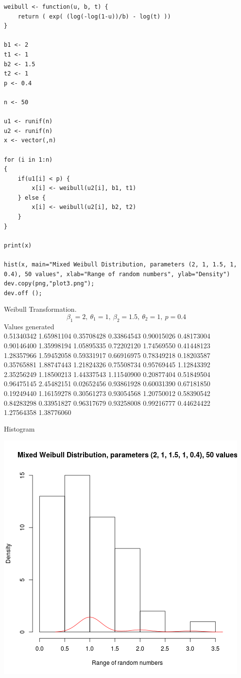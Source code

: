 \documentclass{article}
\begin{document}

\begin{lstlisting}
weibull <- function(u, b, t) {
	return ( exp( (log(-log(1-u))/b) - log(t) ))
}

b1 <- 2
t1 <- 1
b2 <- 1.5
t2 <- 1
p <- 0.4

n <- 50

u1 <- runif(n)
u2 <- runif(n)
x <- vector(,n)

for (i in 1:n)
{
	if(u1[i] < p) {
		x[i] <- weibull(u2[i], b1, t1)
	} else {
		x[i] <- weibull(u2[i], b2, t2)
	}
}

print(x)

hist(x, main="Mixed Weibull Distribution, parameters (2, 1, 1.5, 1, 0.4), 50 values", xlab="Range of random numbers", ylab="Density")
dev.copy(png,"plot3.png");
dev.off ();
\end{lstlisting}

Weibull Transformation.\\
$$\beta_1=2,\ \theta_1=1,\ \beta_2=1.5,\ \theta_2=1,\ p=0.4$$
Values generated\\
0.51340342 1.65981104 0.35708428 0.33864543 0.90015026 0.48173004\\
0.90146400 1.35998194 1.05895335 0.72202120 1.74569550 0.41448123\\
1.28357966 1.59452058 0.59331917 0.66916975 0.78349218 0.18203587\\
0.35765881 1.88747443 1.21824326 0.75508734 0.95769445 1.12843392\\
2.35256249 1.18500213 1.44337543 1.11540900 0.20877404 0.51849504\\
0.96475145 2.45482151 0.02652456 0.93861928 0.60031390 0.67181850\\
0.19249440 1.16159278 0.30561273 0.93054568 1.20750012 0.58390542\\
0.84283298 0.33951827 0.96317679 0.93258008 0.99216777 0.44624422\\
1.27564358 1.38776060

Histogram

\includegraphics{"plot3"}
\pagebreak
\end{document}
